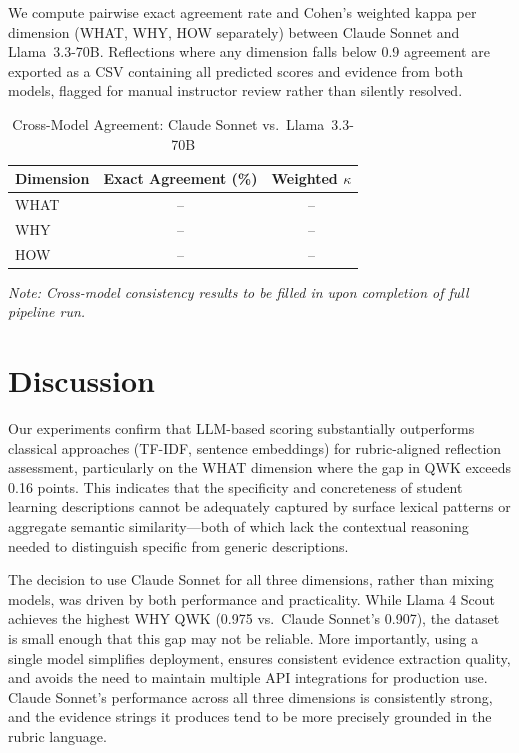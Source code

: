 \documentclass[11pt]{article}
\begin{document}
We compute pairwise exact agreement rate and Cohen's weighted kappa per dimension (WHAT, WHY, HOW separately) between Claude Sonnet and Llama~3.3-70B. Reflections where any dimension falls below 0.9 agreement are exported as a CSV containing all predicted scores and evidence from both models, flagged for manual instructor review rather than silently resolved.

\begin{table}[H]
\centering
\caption{Cross-Model Agreement: Claude Sonnet vs.\ Llama~3.3-70B}
\label{tab:consistency}
\begin{tabular}{lcc}
\toprule
\textbf{Dimension} & \textbf{Exact Agreement (\%)} & \textbf{Weighted $\kappa$} \\
\midrule
WHAT & -- & -- \\
WHY  & -- & -- \\
HOW  & -- & -- \\
\bottomrule
\end{tabular}
\end{table}

\noindent\textit{Note: Cross-model consistency results to be filled in upon completion of full pipeline run.}

\section{Discussion}

Our experiments confirm that LLM-based scoring substantially outperforms classical approaches (TF-IDF, sentence embeddings) for rubric-aligned reflection assessment, particularly on the WHAT dimension where the gap in QWK exceeds 0.16 points. This indicates that the specificity and concreteness of student learning descriptions cannot be adequately captured by surface lexical patterns or aggregate semantic similarity—both of which lack the contextual reasoning needed to distinguish specific from generic descriptions.

The decision to use Claude Sonnet for all three dimensions, rather than mixing models, was driven by both performance and practicality. While Llama 4 Scout achieves the highest WHY QWK (0.975 vs.\ Claude Sonnet's 0.907), the dataset is small enough that this gap may not be reliable. More importantly, using a single model simplifies deployment, ensures consistent evidence extraction quality, and avoids the need to maintain multiple API integrations for production use. Claude Sonnet's performance across all three dimensions is consistently strong, and the evidence strings it produces tend to be more precisely grounded in the rubric language.
\end{document}
